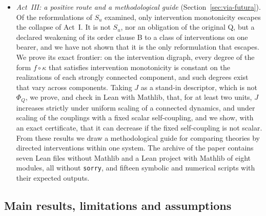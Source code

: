 \begin{itemize}
\item \emph{Act~III: a positive route and a methodological guide} (Section~\ref{sec:via-futura}). Of the reformulations of $S_u$ examined, only intervention monotonicity escapes the collapse of Act~I. It is not $S_u$, nor an obligation of the original Q, but a declared weakening of its order clause B to a class of interventions on one bearer, and we have not shown that it is the only reformulation that escapes. We prove its exact frontier: on the intervention digraph, every degree of the form $f\circ\kappa$ that satisfies intervention monotonicity is constant on the realizations of each strongly connected component, and such degrees exist that vary across components. Taking $J$ as a stand-in descriptor, which is not $\Phi_Q$, we prove, and check in Lean with Mathlib, that, for at least two units, $J$ increases strictly under uniform scaling of a connected dynamics, and under scaling of the couplings with a fixed scalar self-coupling, and we show, with an exact certificate, that it can decrease if the fixed self-coupling is not scalar. From these results we draw a methodological guide for comparing theories by directed interventions within one system. The archive of the paper contains seven Lean files without Mathlib and a Lean project with Mathlib of eight modules, all without \texttt{sorry}, and fifteen symbolic and numerical scripts with their expected outputs.
\end{itemize}

\subsection{Main results, limitations and assumptions}\label{sec:summary}
